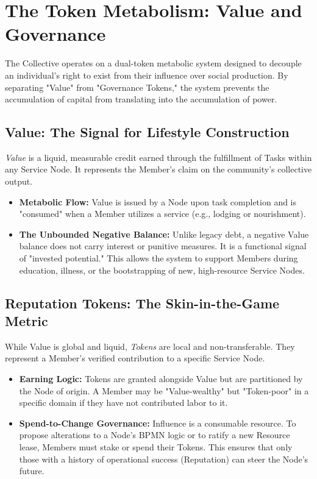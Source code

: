 \section{The Token Metabolism: Value and Governance}

The Collective operates on a dual-token metabolic system designed to decouple an individual's right to exist from their influence over social production. By separating "Value" from "Governance Tokens," the system prevents the accumulation of capital from translating into the accumulation of power.

\subsection{Value: The Signal for Lifestyle Construction}
\textit{Value} is a liquid, measurable credit earned through the fulfillment of Tasks within any Service Node. It represents the Member's claim on the community's collective output. 
\begin{itemize}[leftmargin=*]
    \item \textbf{Metabolic Flow:} Value is issued by a Node upon task completion and is "consumed" when a Member utilizes a service (e.g., lodging or nourishment).
    \item \textbf{The Unbounded Negative Balance:} Unlike legacy debt, a negative Value balance does not carry interest or punitive measures. It is a functional signal of "invested potential." This allows the system to support Members during education, illness, or the bootstrapping of new, high-resource Service Nodes. 
\end{itemize}

\subsection{Reputation Tokens: The Skin-in-the-Game Metric}
While Value is global and liquid, \textit{Tokens} are local and non-transferable. They represent a Member's verified contribution to a specific Service Node.
\begin{itemize}[leftmargin=*]
    \item \textbf{Earning Logic:} Tokens are granted alongside Value but are partitioned by the Node of origin. A Member may be "Value-wealthy" but "Token-poor" in a specific domain if they have not contributed labor to it.
    \item \textbf{Spend-to-Change Governance:} Influence is a consumable resource. To propose alterations to a Node's BPMN logic or to ratify a new Resource lease, Members must stake or spend their Tokens. This ensures that only those with a history of operational success (Reputation) can steer the Node's future.
\end{itemize}

